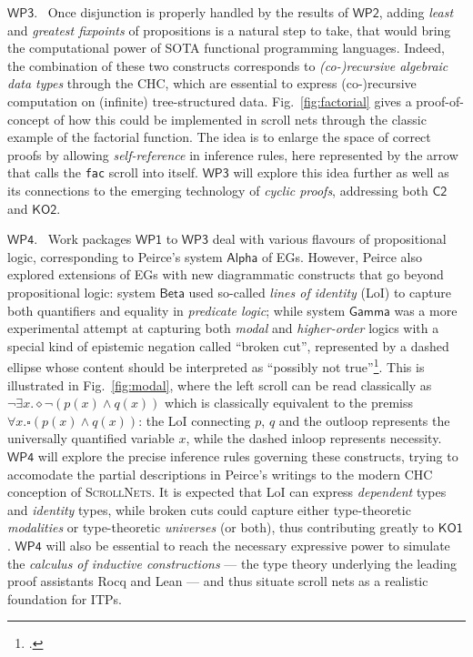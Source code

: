 \documentclass[11pt]{msca-pf}
\newcommand{\proj}{\small\textsc{ScrollNets}}
\newcommand{\CH}[1]{$\mathsf{C#1}$}
\newcommand{\KO}[1]{$\mathsf{KO#1}$}
\newcommand{\WP}[1]{$\mathsf{WP#1}$}
\begin{document}
    \WP{3}.~ Once disjunction is properly handled by the results of \WP{2}, adding \emph{least} and
    \emph{greatest fixpoints} of propositions is a natural step to take, that would bring the
    computational power of SOTA functional programming languages. Indeed, the combination of these
    two constructs corresponds to \emph{(co-)recursive algebraic data types} through the CHC, which
    are essential to express (co-)recursive computation on (infinite) tree-structured data.
    Fig.~\ref{fig:factorial} gives a proof-of-concept of how this could be implemented in scroll
    nets through the classic example of the factorial function. The idea is to enlarge the space of
    correct proofs by allowing \emph{self-reference} in inference rules, here represented by the
    arrow that calls the \texttt{fac} scroll into itself. \WP{3} will explore this idea further as
    well as its connections to the emerging technology of \emph{cyclic proofs}, addressing both
    \CH{2} and \KO{2}. 

    \WP{4}.~ Work packages \WP{1} to \WP{3} deal with various flavours of propositional logic,
    corresponding to Peirce's system $\mathsf{Alpha}$ of EGs. However, Peirce also explored
    extensions of EGs with new diagrammatic constructs that go beyond propositional logic: system
    $\mathsf{Beta}$ used so-called \emph{lines of identity} (LoI) to capture both quantifiers and
    equality in \emph{predicate logic}; while system $\mathsf{Gamma}$ was a more experimental
    attempt at capturing both \emph{modal} and \emph{higher-order} logics with a special kind of
    epistemic negation called ``broken cut'', represented by a dashed ellipse whose content should
    be interpreted as ``possibly not true''\footcite{maGammaGraphCalculi2018}. This is illustrated
    in Fig.~\ref{fig:modal}, where the left scroll can be read classically as $\neg \exists x.
    \diamond \neg (p(x) \land q(x))$ which is classically equivalent to the premiss $\forall x.
    \square (p(x) \land q(x))$: the LoI connecting $p$, $q$ and the outloop represents the
    universally quantified variable $x$, while the dashed inloop represents necessity. \WP{4} will
    explore the precise inference rules governing these constructs, trying to accomodate the partial
    descriptions in Peirce's writings to the modern CHC conception of {\proj}. It is expected that LoI
    can express \emph{dependent} types and \emph{identity} types, while broken cuts could capture
    either type-theoretic \emph{modalities} or type-theoretic \emph{universes} (or both), thus
    contributing greatly to \KO{1}. \WP{4} will also be essential to reach the necessary expressive
    power to simulate the \emph{calculus of inductive constructions} --- the type theory underlying
    the leading proof assistants Rocq and Lean --- and thus situate scroll nets as a realistic
    foundation for ITPs.
\end{document}
